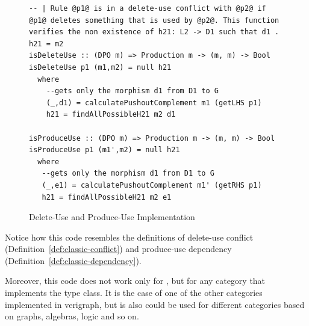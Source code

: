 \begin{figure}[!ht]
\caption{Delete-Use and Produce-Use Implementation}
\begin{verbatim}
-- | Rule @p1@ is in a delete-use conflict with @p2@ if @p1@ deletes something that is used by @p2@. This function verifies the non existence of h21: L2 -> D1 such that d1 . h21 = m2
isDeleteUse :: (DPO m) => Production m -> (m, m) -> Bool
isDeleteUse p1 (m1,m2) = null h21
  where
    --gets only the morphism d1 from D1 to G
    (_,d1) = calculatePushoutComplement m1 (getLHS p1) 
    h21 = findAllPossibleH21 m2 d1

isProduceUse :: (DPO m) => Production m -> (m, m) -> Bool
isProduceUse p1 (m1',m2) = null h21
  where
   --gets only the morphism d1 from D1 to G
   (_,e1) = calculatePushoutComplement m1' (getRHS p1)
   h21 = findAllPossibleH21 m2 e1
\end{verbatim}
\label{fig:verigraph:delete-use-produce-use}
\end{figure}

Notice how this code resembles the definitions of delete-use conflict (Definition~\ref{def:classic-conflict}) and produce-use dependency (Definition~\ref{def:classic-dependency}).

Moreover, this code does not work only for , but for any category that implements the  type class. It is the case of one of the other categories implemented in verigraph,  but is also could be used for different categories based on graphs, algebras, logic and so on.


